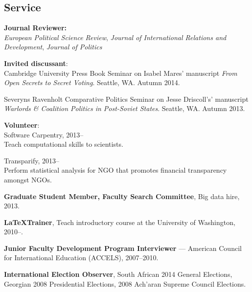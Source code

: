 \documentclass[margin,line]{res}
\begin{document}
{\begin{resume}
\section{\sc Service}
\textbf{Journal Reviewer: }\\
\emph{European Political Science Review}, \emph{Journal of International Relations and
  Development}, \emph{Journal of Politics} \par\smallskip
\textbf{Invited discussant}: \\
  Cambridge University Press Book Seminar on
Isabel Mares' manuscript \emph{From Open Secrets to Secret Voting}. Seattle, WA. Autumn 2014. \par\smallskip
 Severyns Ravenholt Comparative Politics Seminar on
Jesse Driscoll's' manuscript \emph{Warlords \& Coalition Politics in
  Post-Soviet States}. Seattle, WA. Autumn 2013. \par\smallskip
\textbf{Volunteer}: \\
Software Carpentry, 2013--  \\
Teach computational skills to
scientists.\par\smallskip
Transparify, 2013--\\
 Perform statistical analysis for NGO that promotes
financial transparency amongst NGOs.  \par\smallskip
\textbf{Graduate Student Member, Faculty Search Committee}, Big data
hire, 2013. \par\smallskip
\textbf{\LaTeX Trainer}, Teach introductory \latex course at the University of
Washington, 2010--. \par\smallskip
\textbf{Junior Faculty Development Program Interviewer} --- American Council for
International Education (ACCELS), 2007--2010. \par\smallskip
\textbf{International Election Observer}, South African 2014 General
Elections, Georgian 2008 Presidential Elections, 2008 Ach'aran Supreme
Council Elections. 


\end{resume}}
\end{document}
